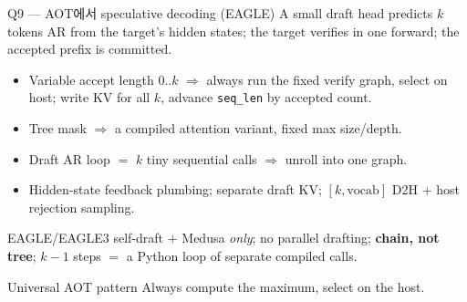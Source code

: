 \begin{frame}{Q9 — AOT에서 speculative decoding (EAGLE)}
   A small draft head predicts $k$ tokens AR from the target's hidden states;
  the target verifies in one forward; the accepted prefix is committed.
  \begin{itemize}
    \item Variable accept length $0..k$ $\Rightarrow$ always run the fixed verify graph, select on host;
          write KV for all $k$, advance \texttt{seq\_len} by accepted count.
    \item Tree mask $\Rightarrow$ a compiled attention variant, fixed max size/depth.
    \item Draft AR loop $=$ $k$ tiny sequential calls $\Rightarrow$ unroll into one graph.
    \item Hidden-state feedback plumbing; separate draft KV; $[k,\text{vocab}]$ D2H $+$ host rejection sampling.
  \end{itemize}
  EAGLE/EAGLE3 self-draft $+$ Medusa \emph{only}; no parallel drafting; \textbf{chain, not tree};
  $k{-}1$ steps $=$ a Python loop of separate compiled calls.
  \begin{alertblock}{Universal AOT pattern}
    Always compute the maximum, select on the host.
  \end{alertblock}
\end{frame}

